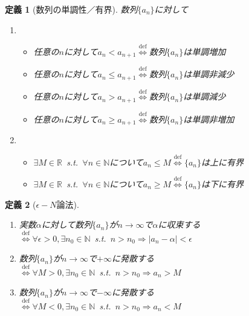 \documentclass[dvipdfmx,a4j,10pt]{jsarticle}
\theoremstyle{mystyle1}
\newtheorem{dfn}{定義}[part]
\theoremstyle{mystyle2}
\newcommand{\defLeftrightarrow}{\overset{\text{def}}{\iff}}
\begin{document}
\begin{framed}
    \begin{dfn}[数列の単調性／有界]\label{dfnyukai}
        数列$\{a_n\}$に対して
        \begin{enumerate}
            \item
        	\begin{itemize}
        		\item 任意の$n$に対して$a_n<a_{n+1}$$\defLeftrightarrow$数列$\{a_n\}$は単調増加
        		\item 任意の$n$に対して$a_n\leq a_{n+1}$$\defLeftrightarrow$数列$\{a_n\}$は単調非減少\footnotemark
        		\item 任意の$n$に対して$a_n>a_{n+1}$$\defLeftrightarrow$数列$\{a_n\}$は単調減少
        		\item 任意の$n$に対して$a_n\geq a_{n+1}$$\defLeftrightarrow$数列$\{a_n\}$は単調非増加\footnotemark
        	\end{itemize}
            \item
        	\begin{itemize}
        	\item	$\exists M\in\mathbb{R}$\ s.t.\ $\forall n\in\mathbb{N}$について$a_n\leq M$$\defLeftrightarrow$$\{a_n\}$は上に有界
        	\item $\exists M\in\mathbb{R}$\ s.t.\ $\forall n\in\mathbb{N}$について$a_n\geq M$$\defLeftrightarrow$$\{a_n\}$は下に有界
        	\end{itemize}
        \end{enumerate}
    \end{dfn}
\end{framed}

\begin{framed}
    \begin{dfn}[$\epsilon -N$論法]\
        \vspace{-\baselineskip}
        \begin{enumerate}
        \item 実数$\alpha$に対して数列$\{a_n\}$が$n\to\infty$で$\alpha$に収束する\\
        	$\defLeftrightarrow$$\forall\epsilon>0,\exists n_0\in\mathbb{N}$\ s.t.\ $n> n_0\Longrightarrow |a_n-\alpha|<\epsilon$\footnotemark
        \item 数列$\{a_n\}$が$n\to\infty$で$+\infty$に発散する\\
        	$\defLeftrightarrow$$\forall M>0,\exists n_0\in\mathbb{N}$\ s.t.\ $n> n_0\Longrightarrow a_n>M$
        \item 数列$\{a_n\}$が$n\to\infty$で$-\infty$に発散する\\
        	$\defLeftrightarrow$$\forall M<0,\exists n_0\in\mathbb{N}$\ s.t.\ $n> n_0\Longrightarrow a_n<M$
        \end{enumerate}
    \end{dfn}
\end{framed}
\end{document}
